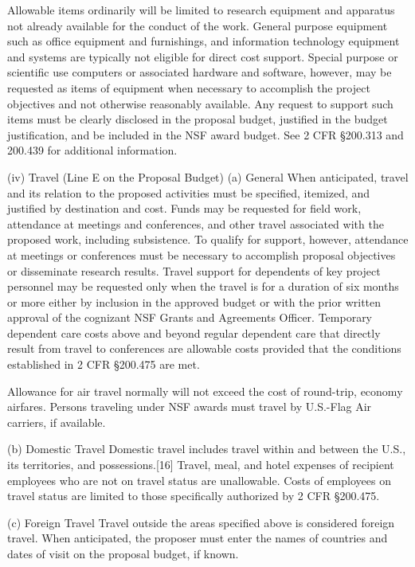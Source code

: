 {Allowable items ordinarily will be limited to research equipment and apparatus not already available for the conduct of the work. General purpose equipment such as office equipment and furnishings, and information technology equipment and systems are typically not eligible for direct cost support. Special purpose or scientific use computers or associated hardware and software, however, may be requested as items of equipment when necessary to accomplish the project objectives and not otherwise reasonably available. Any request to support such items must be clearly disclosed in the proposal budget, justified in the budget justification, and be included in the NSF award budget. See 2 CFR §200.313 and 200.439 for additional information.

(iv) Travel (Line E on the Proposal Budget)
(a) General
When anticipated, travel and its relation to the proposed activities must be specified, itemized, and justified by destination and cost. Funds may be requested for field work, attendance at meetings and conferences, and other travel associated with the proposed work, including subsistence. To qualify for support, however, attendance at meetings or conferences must be necessary to accomplish proposal objectives or disseminate research results. Travel support for dependents of key project personnel may be requested only when the travel is for a duration of six months or more either by inclusion in the approved budget or with the prior written approval of the cognizant NSF Grants and Agreements Officer. Temporary dependent care costs above and beyond regular dependent care that directly result from travel to conferences are allowable costs provided that the conditions established in 2 CFR §200.475 are met.

Allowance for air travel normally will not exceed the cost of round-trip, economy airfares. Persons traveling under NSF awards must travel by U.S.-Flag Air carriers, if available.

(b) Domestic Travel
Domestic travel includes travel within and between the U.S., its territories, and possessions.[16] Travel, meal, and hotel expenses of recipient employees who are not on travel status are unallowable. Costs of employees on travel status are limited to those specifically authorized by 2 CFR §200.475.

(c) Foreign Travel
Travel outside the areas specified above is considered foreign travel. When anticipated, the proposer must enter the names of countries and dates of visit on the proposal budget, if known.

}

